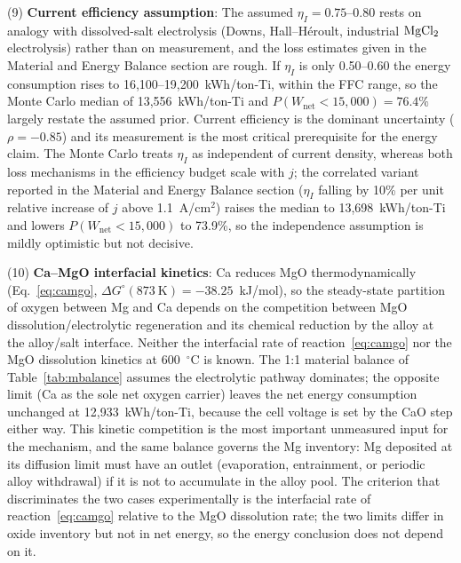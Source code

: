 \documentclass[pdflatex,sn-basic,Numbered]{sn-jnl}
\begin{document}
(9) \textbf{Current efficiency assumption}: The assumed $\eta_I = 0.75$--0.80 rests on analogy with dissolved-salt electrolysis (Downs, Hall--H\'eroult, industrial $\ce{MgCl2}$ electrolysis) rather than on measurement, and the loss estimates given in the Material and Energy Balance section are rough. If $\eta_I$ is only 0.50--0.60 the energy consumption rises to 16{,}100--19{,}200~kWh/ton-Ti, within the FFC range, so the Monte Carlo median of 13{,}556~kWh/ton-Ti and $P(W_{\mathrm{net}} < 15{,}000) = 76.4\%$ largely restate the assumed prior. Current efficiency is the dominant uncertainty ($\rho = -0.85$) and its measurement is the most critical prerequisite for the energy claim. The Monte Carlo treats $\eta_I$ as independent of current density, whereas both loss mechanisms in the efficiency budget scale with $j$; the correlated variant reported in the Material and Energy Balance section ($\eta_I$ falling by 10\% per unit relative increase of $j$ above 1.1~A/cm$^2$) raises the median to 13{,}698~kWh/ton-Ti and lowers $P(W_{\mathrm{net}} < 15{,}000)$ to 73.9\%, so the independence assumption is mildly optimistic but not decisive.

(10) \textbf{Ca--MgO interfacial kinetics}: Ca reduces MgO thermodynamically (Eq.~\ref{eq:camgo}, $\Delta G^{\circ}(873~\mathrm{K}) = -38.25$~kJ/mol), so the steady-state partition of oxygen between Mg and Ca depends on the competition between MgO dissolution/electrolytic regeneration and its chemical reduction by the alloy at the alloy/salt interface. Neither the interfacial rate of reaction~\ref{eq:camgo} nor the MgO dissolution kinetics at 600~$^{\circ}$C is known. The 1:1 material balance of Table~\ref{tab:mbalance} assumes the electrolytic pathway dominates; the opposite limit (Ca as the sole net oxygen carrier) leaves the net energy consumption unchanged at 12{,}933~kWh/ton-Ti, because the cell voltage is set by the CaO step either way. This kinetic competition is the most important unmeasured input for the mechanism, and the same balance governs the Mg inventory: Mg deposited at its diffusion limit must have an outlet (evaporation, entrainment, or periodic alloy withdrawal) if it is not to accumulate in the alloy pool. The criterion that discriminates the two cases experimentally is the interfacial rate of reaction~\ref{eq:camgo} relative to the MgO dissolution rate; the two limits differ in oxide inventory but not in net energy, so the energy conclusion does not depend on it.
\end{document}
